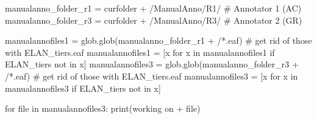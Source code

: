 \documentclass[
  letterpaper,
  DIV=11,
  numbers=noendperiod]{scrreprt}
\newenvironment{Shaded}{\begin{snugshade}}{\end{snugshade}}
\newcommand{\BuiltInTok}[1]{\textcolor[rgb]{0.00,0.23,0.31}{#1}}
\newcommand{\CommentTok}[1]{\textcolor[rgb]{0.37,0.37,0.37}{#1}}
\newcommand{\ControlFlowTok}[1]{\textcolor[rgb]{0.00,0.23,0.31}{#1}}
\newcommand{\KeywordTok}[1]{\textcolor[rgb]{0.00,0.23,0.31}{#1}}
\newcommand{\NormalTok}[1]{\textcolor[rgb]{0.00,0.23,0.31}{#1}}
\newcommand{\OperatorTok}[1]{\textcolor[rgb]{0.37,0.37,0.37}{#1}}
\newcommand{\StringTok}[1]{\textcolor[rgb]{0.13,0.47,0.30}{#1}}
\begin{document}
\begin{Shaded}
\begin{Highlighting}[]
\NormalTok{manualanno\_folder\_r1 }\OperatorTok{=}\NormalTok{ curfolder }\OperatorTok{+} \StringTok{\textquotesingle{}/ManualAnno/R1/\textquotesingle{}}            \CommentTok{\# Annotator 1 (AC)}
\NormalTok{manualanno\_folder\_r3 }\OperatorTok{=}\NormalTok{ curfolder }\OperatorTok{+} \StringTok{\textquotesingle{}/ManualAnno/R3/\textquotesingle{}}            \CommentTok{\# Annotator 2 (GR)}

\NormalTok{manualannofiles1 }\OperatorTok{=}\NormalTok{ glob.glob(manualanno\_folder\_r1 }\OperatorTok{+} \StringTok{\textquotesingle{}/*.eaf\textquotesingle{}}\NormalTok{)}
\CommentTok{\# get rid of those with ELAN\_tiers.eaf}
\NormalTok{manualannofiles1 }\OperatorTok{=}\NormalTok{ [x }\ControlFlowTok{for}\NormalTok{ x }\KeywordTok{in}\NormalTok{ manualannofiles1 }\ControlFlowTok{if} \StringTok{\textquotesingle{}ELAN\_tiers\textquotesingle{}} \KeywordTok{not} \KeywordTok{in}\NormalTok{ x]}
\NormalTok{manualannofiles3 }\OperatorTok{=}\NormalTok{ glob.glob(manualanno\_folder\_r3 }\OperatorTok{+} \StringTok{\textquotesingle{}/*.eaf\textquotesingle{}}\NormalTok{)}
\CommentTok{\# get rid of those with ELAN\_tiers.eaf}
\NormalTok{manualannofiles3 }\OperatorTok{=}\NormalTok{ [x }\ControlFlowTok{for}\NormalTok{ x }\KeywordTok{in}\NormalTok{ manualannofiles3 }\ControlFlowTok{if} \StringTok{\textquotesingle{}ELAN\_tiers\textquotesingle{}} \KeywordTok{not} \KeywordTok{in}\NormalTok{ x]}


\ControlFlowTok{for} \BuiltInTok{file} \KeywordTok{in}\NormalTok{ manualannofiles3:}
    \BuiltInTok{print}\NormalTok{(}\StringTok{\textquotesingle{}working on \textquotesingle{}} \OperatorTok{+} \BuiltInTok{file}\NormalTok{)}


\end{Highlighting}
\end{Shaded}
\end{document}
